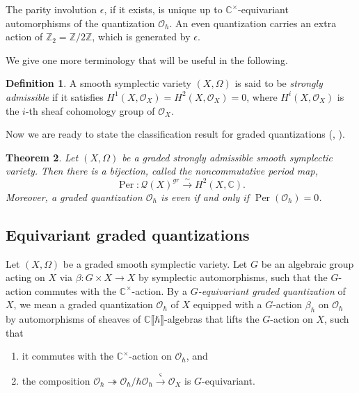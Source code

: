 \documentclass[11pt, a4paper]{amsart}
\newcommand{\C}{\mathbb{C}}
\newcommand{\Z}{\mathbb{Z}}
\newcommand{\hb}{\hbar}
\newcommand{\series}{\llbracket \hb \rrbracket}
\DeclareMathOperator{\Aut}{Aut}
\newcommand{\quan}{\mathcal{Q}}
\newcommand{\per}{\operatorname{Per}}
\newcommand{\cm}{\C^\times}
\newcommand{\OO}{\mathcal{O}}
\newtheorem{Thm}{Theorem}[subsection]
\theoremstyle{definition}
\newtheorem{defi}[Thm]{Definition}
\numberwithin{equation}{section}
\begin{document}
The parity involution $\epsilon$, if it exists, is unique up to $\cm$-equivariant automorphisms of the quantization $\OO_\hb$. An even quantization carries an extra action of $\Z_2 = \Z/2\Z$, which is generated by $\epsilon$. 

We give one more terminology that will be useful in the following.

\begin{defi}\label{defn:strongly_adm}
	A smooth symplectic variety $(X, \Omega)$ is said to be \emph{strongly admissible} if it satisfies $H^1(X,\OO_X) = H^2(X,\OO_X) = 0$, where $H^i(X,\OO_X)$ is the $i$-th sheaf cohomology group of $\OO_X$.
\end{defi}


Now we are ready to state the classification result for graded quantizations (\cite{BeKaledin}, \cite[Corollary 2.3.3]{Losev:isom_quant}). 

\begin{Thm}\label{thm:per_graded}
	Let $(X, \Omega)$ be a graded strongly admissible smooth symplectic variety. Then there is a bijection, called the \emph{noncommutative period map}, 
	\[ \per: \quan(X)^{gr} \xrightarrow{\sim} H^2(X,\C). \]
	Moreover, a graded quantization $\OO_\hb$ is even if and only if $\per(\OO_\hb) = 0$.
\end{Thm}

\subsection{Equivariant graded quantizations} \label{subsec:equiv_quant}

Let $(X, \Omega)$ be a graded smooth symplectic variety. Let $G$ be an algebraic group acting on $X$ via $\beta: G \times X \to X$ by symplectic automorphisms, such that the $G$-action commutes with the $\cm$-action. 
By a {\it $G$-equivariant graded quantization} of $X$, we mean a graded quantization $\OO_\hb$ of $X$ equipped with a $G$-action $\beta_\hb$ on $\OO_\hb$ by automorphisms of sheaves of $\C\series$-algebras that lifts the $G$-action on $X$, such that 
\begin{enumerate}[label=(\roman*)]
	\item
	it commutes with the $\cm$-action on $\OO_\hb$, and
	\item
	the composition $\OO_\hb \twoheadrightarrow \OO_\hb / \hb \OO_\hb \xrightarrow{\varsigma} \OO_X$ is $G$-equivariant.
\end{enumerate}
\end{document}
